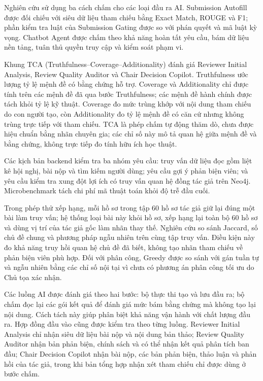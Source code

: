 Nghiên cứu sử dụng ba cách chấm cho các loại đầu ra AI. Submission Autofill được đối chiếu với siêu dữ liệu tham chiếu bằng Exact Match, ROUGE và F1; phần kiểm tra luật của Submission Gating được so với phán quyết và mã luật kỳ vọng. Chatbot Agent được chấm theo khả năng hoàn tất yêu cầu, bám dữ liệu nền tảng, tuân thủ quyền truy cập và kiểm soát phạm vi.

Khung TCA (Truthfulness--Coverage--Additionality) đánh giá Reviewer Initial Analysis, Review Quality Auditor và Chair Decision Copilot. Truthfulness ước lượng tỷ lệ mệnh đề có bằng chứng hỗ trợ. Coverage và Additionality chỉ được tính trên các mệnh đề đã qua bước Truthfulness; các mệnh đề hành chính được tách khỏi tỷ lệ kỹ thuật. Coverage đo mức trùng khớp với nội dung tham chiếu do con người tạo, còn Additionality đo tỷ lệ mệnh đề có căn cứ nhưng không trùng trực tiếp với tham chiếu. TCA là phép chấm tự động thăm dò, chưa được hiệu chuẩn bằng nhãn chuyên gia; các chỉ số này mô tả quan hệ giữa mệnh đề và bằng chứng, không trực tiếp đo tính hữu ích học thuật.

Các kịch bản backend kiểm tra ba nhóm yêu cầu: truy vấn dữ liệu đọc gồm liệt kê hội nghị, bài nộp và tìm kiếm người dùng; yêu cầu gợi ý phản biện viên; và yêu cầu kiểm tra xung đột lợi ích có truy vấn quan hệ đồng tác giả trên Neo4j. Microbenchmark tách chi phí mã thuật toán khỏi độ trễ đầu cuối.

Trong phép thử xếp hạng, mỗi hồ sơ trong tập 60 hồ sơ tác giả giữ lại đúng một bài làm truy vấn; hệ thống loại bài này khỏi hồ sơ, xếp hạng lại toàn bộ 60 hồ sơ và dùng vị trí của tác giả gốc làm nhãn thay thế. Nghiên cứu so sánh Jaccard, số chủ đề chung và phương pháp ngẫu nhiên trên cùng tập truy vấn. Điều kiện này đo khả năng truy hồi quan hệ chủ đề đã biết, không tạo nhãn tham chiếu về phản biện viên phù hợp. Đối với phân công, Greedy được so sánh với gán tuần tự và ngẫu nhiên bằng các chỉ số nội tại vì chưa có phương án phân công tối ưu do Chủ tọa xác nhận.

Các luồng AI được đánh giá theo hai bước: bộ thực thi tạo và lưu đầu ra; bộ chấm đọc lại các gói kết quả để đánh giá mức bám bằng chứng mà không tạo lại nội dung. Cách tách này giúp phân biệt khả năng vận hành với chất lượng đầu ra. Hợp đồng đầu vào cũng được kiểm tra theo từng luồng. Reviewer Initial Analysis chỉ nhận siêu dữ liệu bài nộp và nội dung bản thảo; Review Quality Auditor nhận bản phản biện, chính sách và có thể nhận kết quả phân tích ban đầu; Chair Decision Copilot nhận bài nộp, các bản phản biện, thảo luận và phản hồi của tác giả, trong khi bản tổng hợp nhận xét tham chiếu chỉ được dùng ở bước chấm.

